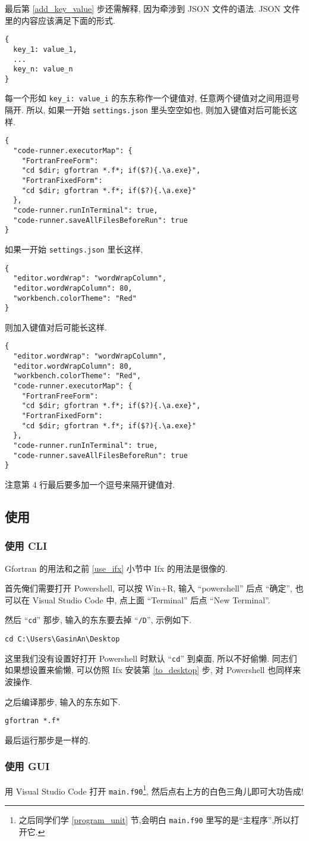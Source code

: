 最后第 \ref{add_key_value} 步还需解释, 因为牵涉到 JSON 文件的语法. JSON 文件里的内容应该满足下面的形式.
\begin{verbatim}
{
  key_1: value_1,
  ...
  key_n: value_n
}
\end{verbatim}
每一个形如 \texttt{key\_{}i: value\_{}i} 的东东称作一个键值对, 任意两个键值对之间用逗号隔开. 所以, 如果一开始 \texttt{settings.json} 里头空空如也, 则加入键值对后可能长这样.
\begin{verbatim}
{
  "code-runner.executorMap": {
    "FortranFreeForm":
    "cd $dir; gfortran *.f*; if($?){.\a.exe}",
    "FortranFixedForm":
    "cd $dir; gfortran *.f*; if($?){.\a.exe}"
  },
  "code-runner.runInTerminal": true,
  "code-runner.saveAllFilesBeforeRun": true
}
\end{verbatim}
如果一开始 \texttt{settings.json} 里长这样,
\begin{verbatim}
{
  "editor.wordWrap": "wordWrapColumn",
  "editor.wordWrapColumn": 80,
  "workbench.colorTheme": "Red"
}
\end{verbatim}
则加入键值对后可能长这样.
\begin{verbatim}
{
  "editor.wordWrap": "wordWrapColumn",
  "editor.wordWrapColumn": 80,
  "workbench.colorTheme": "Red",
  "code-runner.executorMap": {
    "FortranFreeForm":
    "cd $dir; gfortran *.f*; if($?){.\a.exe}",
    "FortranFixedForm":
    "cd $dir; gfortran *.f*; if($?){.\a.exe}"
  },
  "code-runner.runInTerminal": true,
  "code-runner.saveAllFilesBeforeRun": true
}
\end{verbatim}
注意第 4 行最后要多加一个逗号来隔开键值对.

\subsection{使用}\label{use_gfortran}

\subsubsection{使用 CLI}

Gfortran 的用法和之前 \ref{use_ifx} 小节中 Ifx 的用法是很像的.

首先俺们需要打开 Powershell, 可以按 Win+R, 输入 ``powershell'' 后点 ``确定'', 也可以在 Visual Studio Code 中, 点上面 ``Terminal'' 后点 ``New Terminal''.

然后 ``\texttt{cd}'' 那步, 输入的东东要去掉 ``\texttt{/D}'', 示例如下.
\begin{verbatim}
cd C:\Users\GasinAn\Desktop
\end{verbatim}
这里我们没有设置好打开 Powershell 时默认 ``\texttt{cd}'' 到桌面, 所以不好偷懒. 同志们如果想设置来偷懒, 可以仿照 Ifx 安装第 \ref{to_desktop} 步, 对 Powershell 也同样来波操作.

之后编译那步, 输入的东东如下.
\begin{verbatim}
gfortran *.f*
\end{verbatim}

最后运行那步是一样的.

\subsubsection{使用 GUI}

用 Visual Studio Code 打开 \texttt{main.f90}\footnote{之后同学们学 \ref{program_unit} 节,会明白 \texttt{main.f90} 里写的是``主程序'',所以打开它.}, 然后点右上方的白色三角儿即可大功告成!
